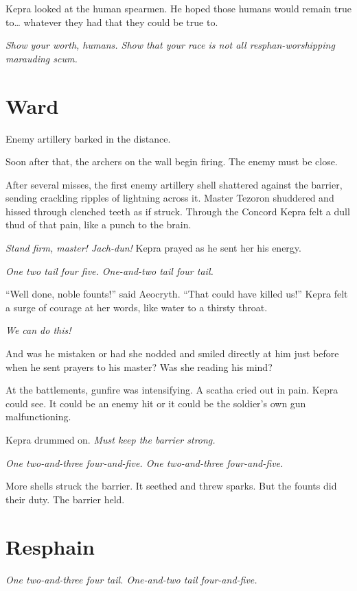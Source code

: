 \documentclass
  [a4paper,
   12pt,
   oneside
  ]%
  {article}
\newcommand{\drum}[1]{\textsl{#1}}
\begin{document}
Kepra looked at the human spearmen. He hoped those humans would remain true to… whatever they had that they could be true to. 

\emph{Show your worth, humans. Show that your race is not all resphan-worshipping marauding scum.}



\section{Ward}
Enemy artillery barked in the distance.

Soon after that, the archers on the wall begin firing. The enemy must be close.

After several misses, the first enemy artillery shell shattered against the barrier, sending crackling ripples of lightning across it. Master Tezoron shuddered and hissed through clenched teeth as if struck. Through the Concord Kepra felt a dull thud of that pain, like a punch to the brain. 

\emph{Stand firm, master! Jach-dun!} Kepra prayed as he sent her his energy.

\drum{One two \emph{tail} four five. One-and-two \emph{tail} four \emph{tail}.}

``Well done, noble founts!'' said Aeocryth. ``That could have killed us!'' 
Kepra felt a surge of courage at her words, like water to a thirsty throat. 

\emph{We can do this!}

And was he mistaken or had she nodded and smiled directly at him just before when he sent prayers to his master? 
Was she reading his mind?

At the battlements, gunfire was intensifying. A scatha cried out in pain. Kepra could see. It could be an enemy hit or it could be the soldier’s own gun malfunctioning.

Kepra drummed on. 
\emph{Must keep the barrier strong.}

\drum{One two-and-three four-and-five. One two-and-three four-and-five.}

More shells struck the barrier. It seethed and threw sparks. But the founts did their duty. The barrier held.



\section{Resphain}
\drum{One two-and-three four \emph{tail}. One-and-two \emph{tail} four-and-five.}
\end{document}
